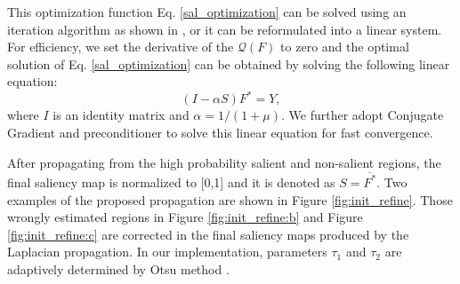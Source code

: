 \documentclass[journal]{IEEEtran}
\begin{document}
This optimization function Eq. \ref{sal_optimization} can be solved using an iteration algorithm as shown in \cite{zhou2004learning}, or it can be reformulated into a linear system. For efficiency, we set the derivative of the $\mathcal{Q}({F})$ to zero and the optimal solution of Eq. \ref{sal_optimization} can be obtained by solving the following linear equation:
\begin{equation}\label{opt_solution}
  (I - \alpha S){{F}^*} = {Y},
\end{equation}
where $I$ is an identity matrix and $\alpha = 1/(1+\mu)$. We further adopt Conjugate Gradient and  preconditioner to solve this linear equation for fast convergence.

After propagating from the high probability salient and non-salient regions, the final saliency map is normalized to [0,1] and it is denoted as ${S} = \overline {{F}^*}$. Two examples of the proposed propagation are shown in Figure \ref{fig:init_refine}. Those wrongly estimated regions in Figure \ref{fig:init_refine:b} and Figure \ref{fig:init_refine:c} are corrected in the final saliency maps produced by the Laplacian propagation. In our implementation, parameters $\tau_1$ and $\tau_2$ are adaptively determined by Otsu method \cite{otsu1975threshold}.
\end{document}
